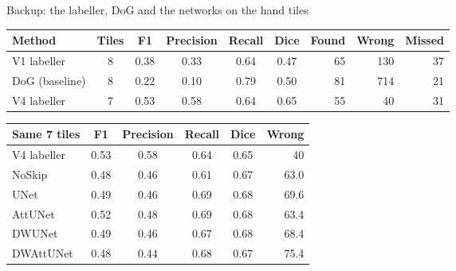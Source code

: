 \begin{frame}{Backup: the labeller, DoG and the networks on the hand tiles}
  \centering\scriptsize
  \renewcommand{\arraystretch}{1.05}\setlength{\tabcolsep}{3.5pt}
\begin{tabular}{@{}lcccccrrr@{}}
\toprule
\textbf{Method} & \textbf{Tiles} & \textbf{F1} & \textbf{Precision} & \textbf{Recall} & \textbf{Dice} & \textbf{Found} & \textbf{Wrong} & \textbf{Missed} \\
\midrule
V1 labeller & 8 & 0.38 & 0.33 & 0.64 & 0.47 & 65 & 130 & 37 \\
DoG (baseline) & 8 & 0.22 & 0.10 & 0.79 & 0.50 & 81 & 714 & 21 \\
V4 labeller & 7 & 0.53 & 0.58 & 0.64 & 0.65 & 55 & 40 & 31 \\
\bottomrule
\end{tabular}

  \vspace{3mm}
\begin{tabular}{@{}lccccr@{}}
\toprule
\textbf{Same 7 tiles} & \textbf{F1} & \textbf{Precision} & \textbf{Recall} & \textbf{Dice} & \textbf{Wrong} \\
\midrule
V4 labeller & 0.53 & 0.58 & 0.64 & 0.65 & 40 \\
NoSkip & 0.48 & 0.46 & 0.61 & 0.67 & 63.0 \\
UNet & 0.49 & 0.46 & 0.69 & 0.68 & 69.6 \\
AttUNet & 0.52 & 0.48 & 0.69 & 0.68 & 63.4 \\
DWUNet & 0.49 & 0.46 & 0.67 & 0.68 & 68.4 \\
DWAttUNet & 0.48 & 0.44 & 0.68 & 0.67 & 75.4 \\
\bottomrule
\end{tabular}
  \vfill
\end{frame}

